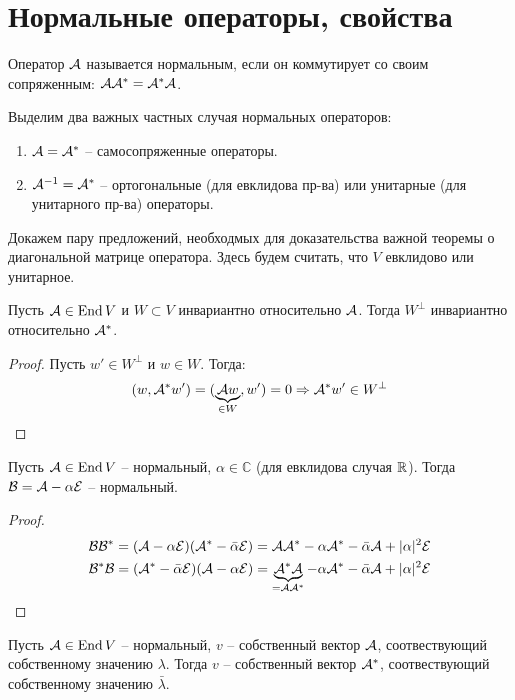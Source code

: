 \section{Нормальные операторы, свойства}
\begin{conj}
    Оператор $\mathcal{A}$ называется нормальным, если он коммутирует со своим сопряженным: $\mathcal{A}\mathcal{A}^* = \mathcal{A}^*\mathcal{A}$.
\end{conj}
Выделим два важных частных случая нормальных операторов:
\begin{enumerate}
    \item $\mathcal{A} = \mathcal{A}^*$ -- самосопряженные операторы.
    \item $\mathcal{A}^{-1} = \mathcal{A}^*$ -- ортогональные (для евклидова пр-ва) или унитарные (для унитарного пр-ва) операторы.
\end{enumerate}

Докажем пару предложений, необходмых для доказательства важной теоремы о диагональной матрице оператора.
Здесь будем считать, что $V$ евклидово или унитарное.

\begin{theorem-non}
    Пусть $\mathcal{A} \in \operatorname{End} V$ и $W \subset V$ инвариантно относительно $\mathcal{A}$. 
    Тогда $W^\perp$ инвариантно относительно $\mathcal{A}^*$.
\end{theorem-non}
\begin{proof}
    Пусть $w' \in W^\perp$ и $w \in W$. Тогда: \[ (w, \mathcal{A}^*w') = (\underbrace{\mathcal{A} w}_{\in W}, w') = 0 \Rightarrow \mathcal{A}^*w' \in W^\perp \]
\end{proof}

\begin{theorem-non}
    Пусть $\mathcal{A} \in \operatorname{End} V$ -- нормальный, $\alpha \in \mathbb{C}$ (для евклидова случая $\mathbb{R}$). Тогда $\mathcal{B} = \mathcal{A} - \alpha \mathcal{E}$ -- нормальный.
\end{theorem-non}

\begin{proof}
    \begin{gather*}
        \mathcal{B}\mathcal{B}^* = (\mathcal{A} - \alpha\mathcal{E})(\mathcal{A}^* - \bar{\alpha}\mathcal{E}) = \mathcal{A}\mathcal{A}^* - \alpha\mathcal{A}^* - \bar{\alpha}\mathcal{A} + |\alpha|^2\mathcal{E} \\
        \mathcal{B}^*\mathcal{B} = (\mathcal{A}^* - \bar{\alpha}\mathcal{E})(\mathcal{A} - \alpha\mathcal{E}) = \underbrace{\mathcal{A}^*\mathcal{A}}_{= \mathcal{A}\mathcal{A}^*} - \alpha\mathcal{A}^* - \bar{\alpha}\mathcal{A} + |\alpha|^2\mathcal{E} \\
    \end{gather*}
\end{proof}

\begin{theorem-non}
    Пусть $\mathcal{A} \in \operatorname{End} V$ -- нормальный, $v$ -- собственный вектор $\mathcal{A}$, соотвествующий собственному значению $\lambda$.
    Тогда $v$ -- собственный вектор $\mathcal{A}^*$, соотвествующий собственному значению $\bar{\lambda}$.
\end{theorem-non}

